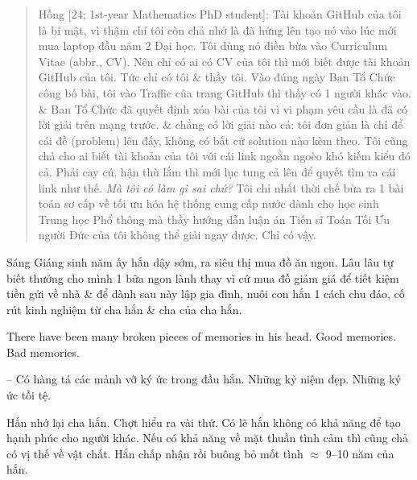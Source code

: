 \documentclass[12pt,oneside]{book}
\begin{document}
\begin{quote}
	{\sf Hồng [24; 1st-year Mathematics PhD student]}: Tài khoản {\sf GitHub} của tôi là bí mật, vì thậm chí tôi còn chả nhớ là đã hứng lên tạo nó vào lúc mới mua laptop đầu năm 2 Đại học. Tôi dùng nó điền bừa vào Curriculum Vitae (abbr., CV). Nên chỉ có ai có CV của tôi thì mới biết được tài khoản {\sf GitHub} của tôi. Tức chỉ có tôi \& thầy tôi. Vào đúng ngày Ban Tổ Chức công bố bài, tôi vào Traffic của trang {\sf GitHub} thì thấy có 1 người khác vào. \& Ban Tổ Chức đã quyết định xóa bài của tôi vì vi phạm yêu cầu là đã có lời giải trên mạng trước. \& chẳng có lời giải nào cả: tôi đơn giản là chỉ để cái đề (problem) lên đấy, không có bất cứ solution nào kèm theo. Tôi cũng chả cho ai biết tài khoản của tôi với cái link ngoằn ngoèo khó kiếm kiểu đó cả. Phải cay cú, hận thù lắm thì mới lục tung cả lên để quyết tìm ra cái link như thế. {\it Mà tôi có làm gì sai chứ?} Tôi chỉ nhất thời chế bừa ra 1 bài toán sơ cấp về tối ưu hóa hệ thống cung cấp nước dành cho học sinh Trung học Phổ thông mà thầy hướng dẫn luận án Tiến sĩ Toán Tối Ưu người Đức của tôi không thể giải ngay được. Chỉ có vậy.
\end{quote}
Sáng Giáng sinh năm ấy hắn dậy sớm, ra siêu thị mua đồ ăn ngon. Lâu lâu tự  biết thưởng cho mình 1 bữa ngon lành thay vì cứ mua đồ giảm giá để tiết kiệm tiền gửi về nhà \& để dành sau này lập gia đình, nuôi con hắn 1 cách chu đáo, cố rút kinh nghiệm từ cha hắn \& cha của cha hắn. 

There have been many broken pieces of memories in his head. Good memories. Bad memories.

-- Có hàng tá các mảnh vỡ ký ức trong đầu hắn. Những kỷ niệm đẹp. Những ký ức tồi tệ.

Hắn nhớ lại cha hắn. Chợt hiểu ra vài thứ. Có lẽ hắn không có khả năng để tạo hạnh phúc cho người khác. Nếu có khả năng về mặt thuần tình cảm thì cũng chả có vị thế về vật chất. Hắn chấp nhận rồi buông bỏ mốt tình $\approx$ 9--10 năm của hắn.
\end{document}
